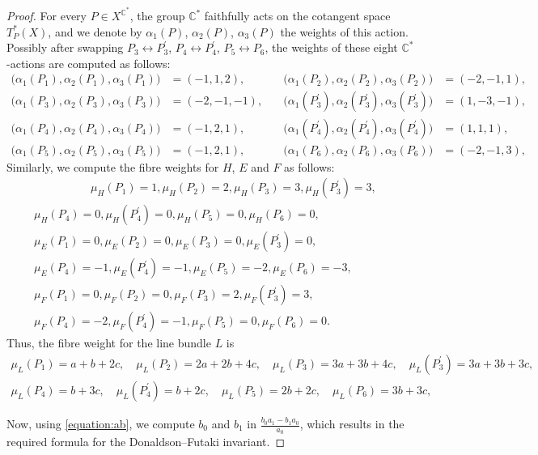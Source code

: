 \documentclass[10pt,a4paper]{amsart}
\newcommand{\C}{\mathbb{C}}
\begin{document}
\begin{proof}
For every $P\in X^{\C^*}$, the group $\mathbb{C}^*$ faithfully acts on the cotangent space $T_P^*(X)$,
and we denote by $\alpha_1(P)$, $\alpha_2(P)$, $\alpha_3(P)$ the weights of this action.
Possibly after swapping $P_3\leftrightarrow P_3^\prime$, $P_4\leftrightarrow P_4^\prime$, $P_5\leftrightarrow P_6$, 
the weights of these eight $\mathbb{C}^*$-actions are computed as follows:
\begin{align*}
\big(\alpha_1(P_1),\alpha_2(P_1),\alpha_3(P_1)\big)&=(-1,1,2),&\quad
\big(\alpha_1(P_2),\alpha_2(P_2),\alpha_3(P_2)\big)&=(-2,-1,1),&\quad\\
\big(\alpha_1(P_3),\alpha_2(P_3),\alpha_3(P_3)\big)&=(-2,-1,-1),&\quad
\big(\alpha_1(P_3^\prime),\alpha_2(P_3^\prime),\alpha_3(P_3^\prime)\big)&=(1,-3,-1),\\
\big(\alpha_1(P_4),\alpha_2(P_4),\alpha_3(P_4)\big)&=(-1,2,1),&\quad
\big(\alpha_1(P_4^\prime),\alpha_2(P_4^\prime),\alpha_3(P_4^\prime)\big)&=(1,1,1),\\
\big(\alpha_1(P_5),\alpha_2(P_5),\alpha_3(P_5)\big)&=(-1,2,1),&\quad
\big(\alpha_1(P_6),\alpha_2(P_6),\alpha_3(P_6)\big)&=(-2,-1,3),&\quad
\end{align*}
Similarly, we compute the fibre weights for  $H$, $E$ and $F$ as follows:
\begin{multline*}
\quad \quad \quad \quad \quad \mu_H(P_1)=1, \mu_H(P_2)=2, \mu_H(P_3)=3, \mu_H(P_3^\prime)=3, \\
\mu_H(P_4)=0, \mu_H(P_4^\prime)=0, \mu_H(P_5)=0, \mu_H(P_6)=0,\quad \\
\mu_E(P_1)=0, \mu_E(P_2)=0, \mu_E(P_3)=0, \mu_E(P_3^\prime)=0, \\
\mu_E(P_4)=-1, \mu_E(P_4^\prime)=-1, \mu_E(P_5)=-2, \mu_E(P_6)=-3, \\
\mu_F(P_1)=0, \mu_F(P_2)=0, \mu_F(P_3)=2, \mu_F(P_3^\prime)=3, \\
\mu_F(P_4)=-2, \mu_F(P_4^\prime)=-1,  \mu_F(P_5)=0, \mu_F(P_6)=0.\quad \quad \quad \quad \quad
\end{multline*}
Thus, the fibre weight for the line bundle $L$ is
\begin{multline*}
\mu_L(P_1)=a+b+2c,\quad
\mu_L(P_2)=2a+2b+4c,\quad
\mu_L(P_3)=3a+3b+4c,\quad
\mu_L(P_3^\prime)=3a+3b+3c,\quad\\
\mu_L(P_4)=b+3c,\quad
\mu_L(P_4^\prime)=b+2c,\quad
\mu_L(P_5)=2b+2c,\quad
\mu_L(P_6)=3b+3c,\quad
\end{multline*}

Now, using \eqref{equation:ab}, we compute $b_0$ and $b_1$ in $\frac{b_0a_1-b_1a_0}{a_0}$, which results
in the required formula for the Donaldson--Futaki invariant.
\end{proof}
\end{document}
